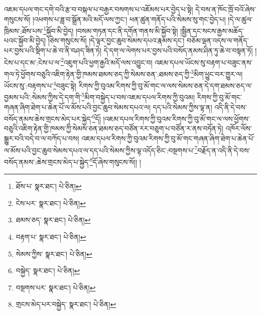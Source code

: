 འཇམ་དཔལ་གང་དགེ་བའི་རྩ་བ་བསྐལ་པ་བརྒྱར་བསགས་པ་འཇོམས་པར་བྱེད་པ་སྟེ། དེ་བས་ན་ཁོང་ཁྲོ་བའོ་ཞེས་གསུངས་སོ། །འཕགས་པ་ཟླ་བ་སྒྲོན་མའི་མདོ་ལས་ཀྱང་། ཕན་ཚུན་གནོད་པའི་སེམས་སུ་གང་བྱེད་པ། །དེ་ལ་ཚུལ་ཁྲིམས་:ཐོས་པས་\footnote{ཐོས་པ་  སྣར་ཐང་།  པེ་ཅིན། }སྐྱོབ་མི་བྱེད། །བསམ་གཏན་དང་ནི་དགོན་གནས་མི་སྐྱོབ་སྟེ། །སྦྱིན་དང་སངས་རྒྱས་མཆོད་པའང་སྐྱོབ་མི་བྱེད། །ཅེས་གསུངས་སོ། །དེ་ལྟར་བྱང་ཆུབ་སེམས་དཔའ་རྣམས་དང་། བཅོམ་ལྡན་འདས་ལ་གནོད་པར་བྱས་པའི་སྡིག་པ་ཆེ་བ་ནི་བཤད་ཟིན་ཏེ། དེ་དག་ལ་ལེགས་པར་བྱས་པའི་བསོད་ནམས་ཤིན་ཏུ་ཆེ་བ་བསྟན་ཏོ། །ངེས་པ་དང་མ་:ངེས་པ་ལ་\footnote{ངེས་པར་  སྣར་ཐང་།  པེ་ཅིན། }འཇུག་པའི་ཕྱག་རྒྱའི་མདོ་ལས་འབྱུང་བ། འཇམ་དཔལ་ཡོངས་སུ་བརྟག་པ་བཟུང་ནས་གལ་ཏེ་ཕྱོགས་བཅུའི་འཇིག་རྟེན་གྱི་ཁམས་ཐམས་ཅད་ཀྱི་སེམས་ཅན་:ཐམས་ཅད་ཀྱི་\footnote{ཐམས་ཅད་  སྣར་ཐང་།  པེ་ཅིན། }མིག་ཕྱུང་བར་གྱུར་ལ། ཡོངས་སུ་:བརྟགས་པ་\footnote{བརྟག་པ་  སྣར་ཐང་།  པེ་ཅིན། }བཟུང་སྟེ། རིགས་ཀྱི་བུའམ་རིགས་ཀྱི་བུ་མོ་གང་ལ་ལས་སེམས་ཅན་དེ་དག་ཐམས་ཅད་ལ་བྱམས་པའི་:སེམས་ཀྱིས་དེ་དག་གི་\footnote{སེམས་ཀྱིས་  སྣར་ཐང་།  པེ་ཅིན། }མིག་བསྐྱེད་པ་བས་འཇམ་དཔལ་རིགས་ཀྱི་བུའམ། རིགས་ཀྱི་བུ་མོ་གང་གཞན་ཞིག་ཐེག་པ་ཆེན་པོ་ལ་མོས་པའི་བྱང་ཆུབ་སེམས་དཔའ་ལ། དད་པའི་སེམས་ཀྱིས་ལྟ་ན། འདི་ནི་དེ་བས་བསོད་ནམས་ཆེས་གྲངས་མེད་པར་སྐྱེད་\footnote{བསྐྱེད་  སྣར་ཐང་།  པེ་ཅིན། }དོ། །འཇམ་དཔལ་རིགས་ཀྱི་བུའམ་རིགས་ཀྱི་བུ་མོ་གང་ལ་ལས་ཕྱོགས་བཅུའི་འཇིག་རྟེན་གྱི་ཁམས་ཀྱི་སེམས་ཅན་ཐམས་ཅད་བཙོན་རར་བཅུག་པ་བཙོན་ར་ནས་བཏོན་ཏེ། འཁོར་ལོས་སྒྱུར་བའི་བདེ་བ་ལ་བཀོད་པ་བས། འཇམ་དཔལ་རིགས་ཀྱི་བུའམ་རིགས་ཀྱི་བུ་མོ་གང་གཞན་ཞིག་ཐེག་པ་ཆེན་པོ་ལ་མོས་པའི་བྱང་ཆུབ་སེམས་དཔའ་ལ་དད་པའི་སེམས་ཀྱིས་ལྟ་འདོད་ཅིང་:བསྔགས་པ་\footnote{བསྔགས་པར་  སྣར་ཐང་།  པེ་ཅིན། }བརྗོད་ན་འདི་ནི་དེ་བས་བསོད་ནམས་:ཆེས་གྲངས་མེད་པ་སྐྱེད་\footnote{གྲངས་མེད་པར་བསྐྱེད་  སྣར་ཐང་།  པེ་ཅིན། }དོ་ཞེས་གསུངས་སོ།། །
